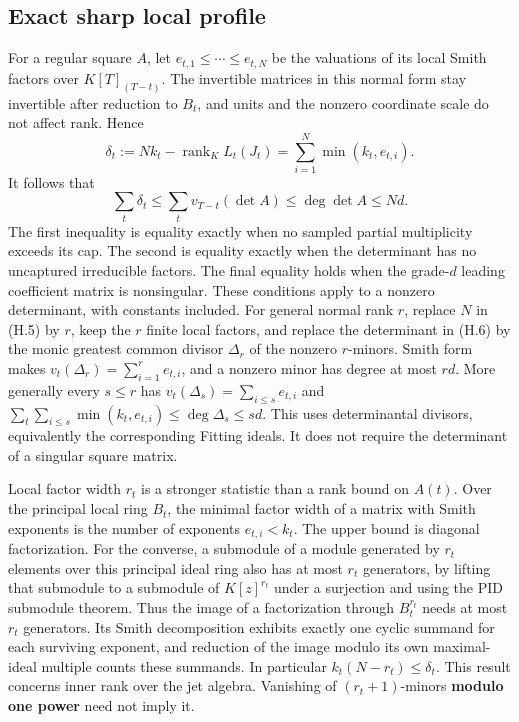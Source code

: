 \documentclass[
  11pt,
]{article}
\begin{document}
\subsection{Exact sharp local profile}\label{exact-sharp-local-profile}

For a regular square \(A\), let \(e_{t,1}\le\cdots\le e_{t,N}\) be the
valuations of its local Smith factors over \(K[T]_{(T-t)}\). The
invertible matrices in this normal form stay invertible after reduction
to \(B_t\), and units and the nonzero coordinate scale do not affect
rank. Hence \[
 \delta_t:=Nk_t-\operatorname{rank}_K L_t(J_t)
         =\sum_{i=1}^N\min(k_t,e_{t,i}). \tag{H.5}
\] It follows that \[
 \sum_t\delta_t\le\sum_t v_{T-t}(\det A)\le\deg\det A\le Nd. \tag{H.6}
\] The first inequality is equality exactly when no sampled partial
multiplicity exceeds its cap. The second is equality exactly when the
determinant has no uncaptured irreducible factors. The final equality
holds when the grade-\(d\) leading coefficient matrix is nonsingular.
These conditions apply to a nonzero determinant, with constants
included. For general normal rank \(r\), replace \(N\) in (H.5) by
\(r\), keep the \(r\) finite local factors, and replace the determinant
in (H.6) by the monic greatest common divisor \(\Delta_r\) of the
nonzero \(r\)-minors. Smith form makes
\(v_t(\Delta_r)=\sum_{i=1}^r e_{t,i}\), and a nonzero minor has degree
at most \(rd\). More generally every \(s\le r\) has
\(v_t(\Delta_s)=\sum_{i\le s}e_{t,i}\) and
\(\sum_t\sum_{i\le s}\min(k_t,e_{t,i})\le\deg\Delta_s\le sd\). This uses
determinantal divisors, equivalently the corresponding Fitting ideals.
It does not require the determinant of a singular square matrix.

Local factor width \(r_t\) is a stronger statistic than a rank bound on
\(A(t)\). Over the principal local ring \(B_t\), the minimal factor
width of a matrix with Smith exponents is the number of exponents
\(e_{t,i}<k_t\). The upper bound is diagonal factorization. For the
converse, a submodule of a module generated by \(r_t\) elements over
this principal ideal ring also has at most \(r_t\) generators, by
lifting that submodule to a submodule of \(K[z]^{r_t}\) under a
surjection and using the PID submodule theorem. Thus the image of a
factorization through \(B_t^{r_t}\) needs at most \(r_t\) generators.
Its Smith decomposition exhibits exactly one cyclic summand for each
surviving exponent, and reduction of the image modulo its own
maximal-ideal multiple counts these summands. In particular
\(k_t(N-r_t)\le\delta_t\). This result concerns inner rank over the jet
algebra. Vanishing of \((r_t+1)\)-minors \textbf{modulo one power} need
not imply it.
\end{document}

